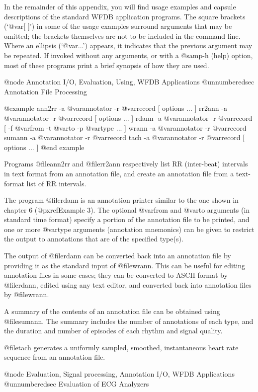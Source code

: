 {{{{{{{{In the remainder of this appendix, you will find usage examples and
capsule descriptions of the standard WFDB application programs.  The
square brackets (`@var{[ ]}') in some of the usage examples surround
arguments that may be omitted;  the brackets themselves are not
to be included in the command line.  Where an ellipsis (`@var{...}')
appears, it indicates that the previous argument may be repeated.
If invoked without any arguments, or with a @samp{-h} (help) option, most of
these programs print a brief synopsis of how they are used.

@node     Annotation I/O, Evaluation, Using, WFDB Applications
@unnumberedsec Annotation File Processing

@example
ann2rr -a @var{annotator} -r @var{record [ options ... ]}
rr2ann -a @var{annotator} -r @var{record [ options ... ]}
rdann -a @var{annotator} -r @var{record [} -f @var{from} -t @var{to} -p @var{type ... ]}
wrann -a @var{annotator} -r @var{record}
sumann -a @var{annotator} -r @var{record}
tach -a @var{annotator} -r @var{record [ options ... ]}
@end example

Programs @file{ann2rr} and @file{rr2ann} respectively list RR (inter-beat)
intervals in text format from an annotation file, and create an annotation
file from a text-format list of RR intervals.

The program @file{rdann} is an annotation printer similar to the one
shown in chapter 6 (@pxref{Example 3}).  The optional @var{from} and
@var{to} arguments (in standard time format) specify a portion of the
annotation file to be printed, and one or more @var{type} arguments
(annotation mnemonics) can be given to restrict the output to
annotations that are of the specified type(s).

The output of @file{rdann} can be converted back into an annotation file
by providing it as the standard input of @file{wrann}.  This can be
useful for editing annotation files in some cases;  they can be
converted to ASCII format by @file{rdann}, edited using any text editor,
and converted back into annotation files by @file{wrann}.

A summary of the contents of an annotation file can be obtained using
@file{sumann}.  The summary includes the number of annotations of each
type, and the duration and number of episodes of each rhythm and signal
quality.

@file{tach} generates a uniformly sampled, smoothed, instantaneous heart
rate sequence from an annotation file.

@node     Evaluation, Signal processing, Annotation I/O, WFDB Applications
@unnumberedsec Evaluation of ECG Analyzers

}}}}}}}}
